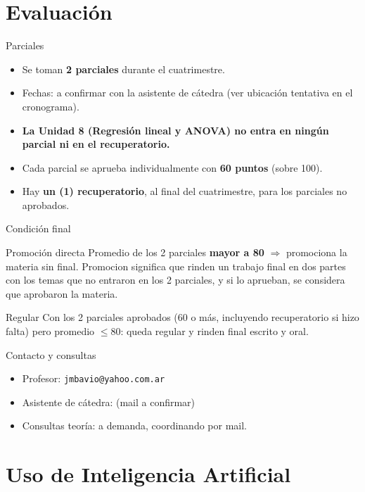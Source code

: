 \documentclass[aspectratio=169,11pt]{beamer}
\begin{document}
\section{Evaluación}

\begin{frame}{Parciales}
\begin{itemize}
\item Se toman \textbf{2 parciales} durante el cuatrimestre.
\item Fechas: a confirmar con la asistente de cátedra (ver ubicación tentativa en el cronograma).
\item \textbf{La Unidad 8 (Regresión lineal y ANOVA) no entra en ningún parcial ni en el recuperatorio.}
\item Cada parcial se aprueba individualmente con \textbf{60 puntos} (sobre 100).
\item Hay \textbf{un (1) recuperatorio}, al final del cuatrimestre, para los parciales no aprobados.
\end{itemize}
\end{frame}

\begin{frame}{Condición final}
\begin{block}{Promoción directa}
Promedio de los 2 parciales \textbf{mayor a 80} $\Rightarrow$ promociona la materia sin final. Promocion significa que rinden un trabajo final en dos partes con los temas que no entraron en los 2 parciales, y si lo aprueban, se considera que aprobaron la materia.  
\end{block}
\begin{block}{Regular}
Con los 2 parciales aprobados (60 o más, incluyendo recuperatorio si hizo falta) pero promedio $\le 80$: queda regular y rinden final escrito y oral.
\end{block}
\end{frame}

\begin{frame}{Contacto y consultas}
\begin{itemize}
\item Profesor: \texttt{jmbavio@yahoo.com.ar}
\item Asistente de cátedra: (mail a confirmar)
\item Consultas teoría: a demanda, coordinando por mail.
\end{itemize}
\end{frame}

\section{Uso de Inteligencia Artificial}
\end{document}

